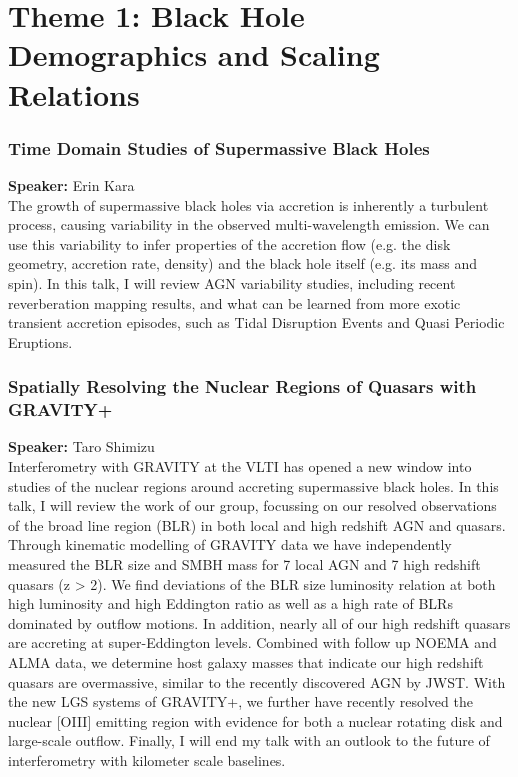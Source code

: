 \hypertarget{abs-day-monday}{}

\section*{Theme 1: Black Hole Demographics and Scaling Relations}

\hypertarget{abs-8}{}
\subsubsection*{Time Domain Studies of Supermassive Black Holes}
\textbf{Speaker:} Erin Kara \invitedbadge{}\\

The growth of supermassive black holes via accretion is inherently a turbulent process, causing variability in the observed multi-wavelength emission. We can use this variability to infer properties of the accretion flow (e.g. the disk geometry, accretion rate, density) and the black hole itself (e.g. its mass and spin). In this talk, I will review AGN variability studies, including recent reverberation mapping results, and what can be learned from more exotic transient accretion episodes, such as Tidal Disruption Events and Quasi Periodic Eruptions.

\hypertarget{abs-9}{}
\subsubsection*{Spatially Resolving the Nuclear Regions of Quasars with GRAVITY+}
\textbf{Speaker:} Taro Shimizu \invitedbadge{}\\

Interferometry with GRAVITY at the VLTI has opened a new window into studies of the nuclear regions around accreting supermassive black holes. In this talk, I will review the work of our group, focussing on our resolved observations of the broad line region (BLR) in both local and high redshift AGN and quasars. Through kinematic modelling of GRAVITY data we have independently measured the BLR size and SMBH mass for 7 local AGN and 7 high redshift quasars (z > 2). We find deviations of the BLR size luminosity relation at both high luminosity and high Eddington ratio as well as a high rate of BLRs dominated by outflow motions. In addition, nearly all of our high redshift quasars are accreting at super-Eddington levels. Combined with follow up NOEMA and ALMA data, we determine host galaxy masses that indicate our high redshift quasars are overmassive, similar to the recently discovered AGN by JWST. With the new LGS systems of GRAVITY+, we further have recently resolved the nuclear [OIII] emitting region with evidence for both a nuclear rotating disk and large-scale outflow. Finally, I will end my talk with an outlook to the future of interferometry with kilometer scale baselines.

